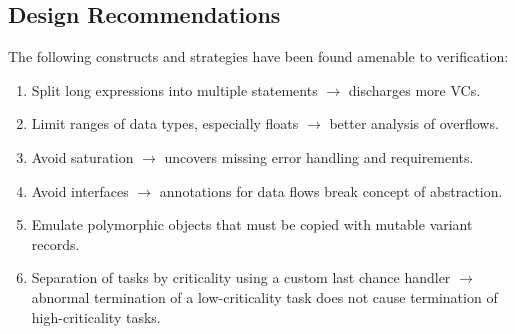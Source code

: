 \subsection{Design Recommendations}\label{sec:recommendations}
The following constructs and strategies have been found amenable to verification:\vspace{-1mm}
\begin{enumerate}
\item Split long expressions into multiple statements $\rightarrow$ discharges more VCs. %
\item Limit ranges of data types, especially floats $\rightarrow$ better analysis of overflows.
\item Avoid saturation $\rightarrow$ uncovers missing error handling and requirements.
\item Avoid interfaces $\rightarrow$ annotations for data flows break concept of abstraction.
\item Emulate polymorphic objects that must be copied with mutable variant records.
\item Separation of tasks by criticality using a custom last chance handler $\rightarrow$ abnormal termination of a low-criticality task does not cause termination of high-criticality tasks.
\end{enumerate}


